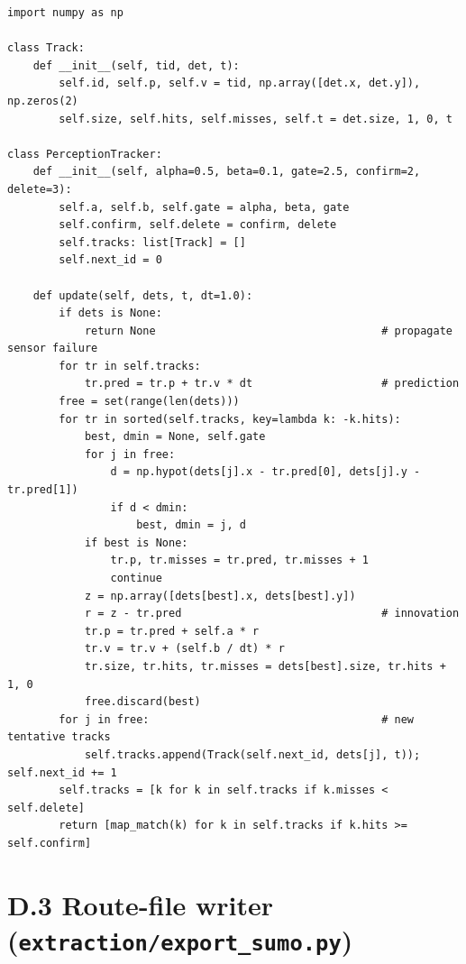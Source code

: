 \begin{lstlisting}[style=py,caption={Nearest-neighbour association with $\alpha$--$\beta$ filtering},label={lst:app-tracker}]
import numpy as np

class Track:
    def __init__(self, tid, det, t):
        self.id, self.p, self.v = tid, np.array([det.x, det.y]), np.zeros(2)
        self.size, self.hits, self.misses, self.t = det.size, 1, 0, t

class PerceptionTracker:
    def __init__(self, alpha=0.5, beta=0.1, gate=2.5, confirm=2, delete=3):
        self.a, self.b, self.gate = alpha, beta, gate
        self.confirm, self.delete = confirm, delete
        self.tracks: list[Track] = []
        self.next_id = 0

    def update(self, dets, t, dt=1.0):
        if dets is None:
            return None                                   # propagate sensor failure
        for tr in self.tracks:
            tr.pred = tr.p + tr.v * dt                    # prediction
        free = set(range(len(dets)))
        for tr in sorted(self.tracks, key=lambda k: -k.hits):
            best, dmin = None, self.gate
            for j in free:
                d = np.hypot(dets[j].x - tr.pred[0], dets[j].y - tr.pred[1])
                if d < dmin:
                    best, dmin = j, d
            if best is None:
                tr.p, tr.misses = tr.pred, tr.misses + 1
                continue
            z = np.array([dets[best].x, dets[best].y])
            r = z - tr.pred                               # innovation
            tr.p = tr.pred + self.a * r
            tr.v = tr.v + (self.b / dt) * r
            tr.size, tr.hits, tr.misses = dets[best].size, tr.hits + 1, 0
            free.discard(best)
        for j in free:                                    # new tentative tracks
            self.tracks.append(Track(self.next_id, dets[j], t)); self.next_id += 1
        self.tracks = [k for k in self.tracks if k.misses < self.delete]
        return [map_match(k) for k in self.tracks if k.hits >= self.confirm]
\end{lstlisting}

\section*{D.3 Route-file writer (\texttt{extraction/export\_sumo.py})}


